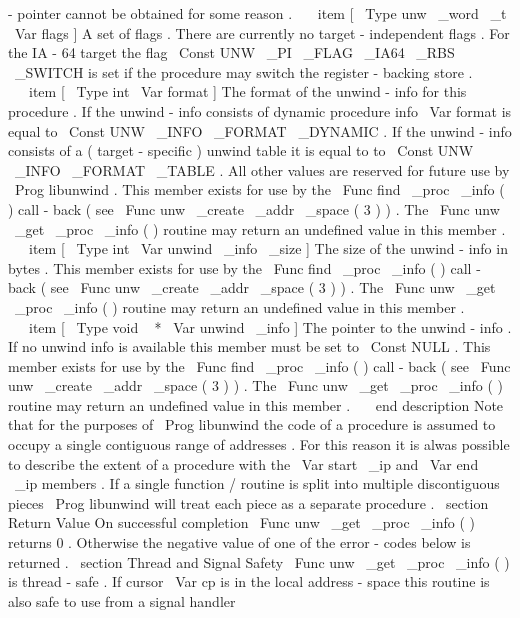 -
pointer
cannot
be
obtained
for
some
reason
.
\
\
\
item
[
\
Type
{
unw
\
_word
\
_t
}
\
Var
{
flags
}
]
A
set
of
flags
.
There
are
currently
no
target
-
independent
flags
.
For
the
IA
-
64
target
the
flag
\
Const
{
UNW
\
_PI
\
_FLAG
\
_IA64
\
_RBS
\
_SWITCH
}
is
set
if
the
procedure
may
switch
the
register
-
backing
store
.
\
\
\
item
[
\
Type
{
int
}
\
Var
{
format
}
]
The
format
of
the
unwind
-
info
for
this
procedure
.
If
the
unwind
-
info
consists
of
dynamic
procedure
info
\
Var
{
format
}
is
equal
to
\
Const
{
UNW
\
_INFO
\
_FORMAT
\
_DYNAMIC
}
.
If
the
unwind
-
info
consists
of
a
(
target
-
specific
)
unwind
table
it
is
equal
to
to
\
Const
{
UNW
\
_INFO
\
_FORMAT
\
_TABLE
}
.
All
other
values
are
reserved
for
future
use
by
\
Prog
{
libunwind
}
.
This
member
exists
for
use
by
the
\
Func
{
find
\
_proc
\
_info
}
(
)
call
-
back
(
see
\
Func
{
unw
\
_create
\
_addr
\
_space
}
(
3
)
)
.
The
\
Func
{
unw
\
_get
\
_proc
\
_info
}
(
)
routine
may
return
an
undefined
value
in
this
member
.
\
\
\
item
[
\
Type
{
int
}
\
Var
{
unwind
\
_info
\
_size
}
]
The
size
of
the
unwind
-
info
in
bytes
.
This
member
exists
for
use
by
the
\
Func
{
find
\
_proc
\
_info
}
(
)
call
-
back
(
see
\
Func
{
unw
\
_create
\
_addr
\
_space
}
(
3
)
)
.
The
\
Func
{
unw
\
_get
\
_proc
\
_info
}
(
)
routine
may
return
an
undefined
value
in
this
member
.
\
\
\
item
[
\
Type
{
void
~
*
}
\
Var
{
unwind
\
_info
}
]
The
pointer
to
the
unwind
-
info
.
If
no
unwind
info
is
available
this
member
must
be
set
to
\
Const
{
NULL
}
.
This
member
exists
for
use
by
the
\
Func
{
find
\
_proc
\
_info
}
(
)
call
-
back
(
see
\
Func
{
unw
\
_create
\
_addr
\
_space
}
(
3
)
)
.
The
\
Func
{
unw
\
_get
\
_proc
\
_info
}
(
)
routine
may
return
an
undefined
value
in
this
member
.
\
\
\
end
{
description
}
Note
that
for
the
purposes
of
\
Prog
{
libunwind
}
the
code
of
a
procedure
is
assumed
to
occupy
a
single
contiguous
range
of
addresses
.
For
this
reason
it
is
alwas
possible
to
describe
the
extent
of
a
procedure
with
the
\
Var
{
start
\
_ip
}
and
\
Var
{
end
\
_ip
}
members
.
If
a
single
function
/
routine
is
split
into
multiple
discontiguous
pieces
\
Prog
{
libunwind
}
will
treat
each
piece
as
a
separate
procedure
.
\
section
{
Return
Value
}
On
successful
completion
\
Func
{
unw
\
_get
\
_proc
\
_info
}
(
)
returns
0
.
Otherwise
the
negative
value
of
one
of
the
error
-
codes
below
is
returned
.
\
section
{
Thread
and
Signal
Safety
}
\
Func
{
unw
\
_get
\
_proc
\
_info
}
(
)
is
thread
-
safe
.
If
cursor
\
Var
{
cp
}
is
in
the
local
address
-
space
this
routine
is
also
safe
to
use
from
a
signal
handler
